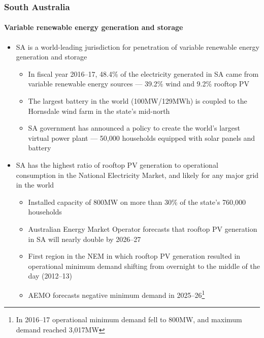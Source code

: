 \documentclass[handout, smaller, xcolor=table]{beamer}			%
\begin{document}
\begin{frame}
	\frametitle{South Australia}
	\framesubtitle{Variable renewable energy generation and storage}

	\begin{itemize}
		\item  SA is a world-leading jurisdiction for penetration of variable renewable energy generation and storage
		\begin{itemize}
			\item  In fiscal year 2016--17, 48.4\% of the electricity generated in SA came from variable renewable energy sources --- 39.2\% wind and 9.2\% rooftop PV
			\item  The largest battery in the world (100MW/129MWh) is coupled to the Hornsdale wind farm in the state's mid-north
			\item  SA government has announced a policy to create the world's largest virtual power plant --- 50,000 households equipped with solar panels and battery
		\end{itemize}
		
		\item  SA has the highest ratio of rooftop PV generation to operational consumption in the National Electricity Market, and likely for any major grid in the world
		\begin{itemize}
			\item  Installed capacity of 800MW on more than 30\% of the state's 760,000 households
			\item  Australian Energy Market Operator forecasts that rooftop PV generation in SA will nearly double by 2026--27
			\item  First region in the NEM in which rooftop PV generation resulted in operational minimum demand shifting from overnight to the middle of the day (2012--13)
			\item  AEMO forecasts negative minimum demand in 2025--26\footnote{\scriptsize In 2016--17 operational minimum demand fell to 800MW, and maximum demand reached 3,017MW
			}
		\end{itemize}
		
	\end{itemize}

\end{frame}
\end{document}
